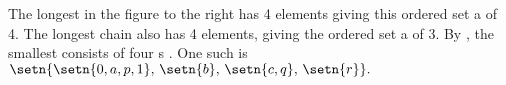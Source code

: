 \begin{minipage}{\tw-55mm}%
\begin{example}
\footnotemark
The longest   in the figure to the right has 4 elements
giving this ordered set a   of 4.
The longest chain also has 4 elements, giving the ordered set a   of 3.
By  , the smallest  consists of four s .
One such  is
  \\\indentx$\setn{\setn{0,a,p,1},\,\setn{b},\,\setn{c,q},\,\setn{r}}.$
\end{example}
\end{minipage}%
%
\hfill{}%



